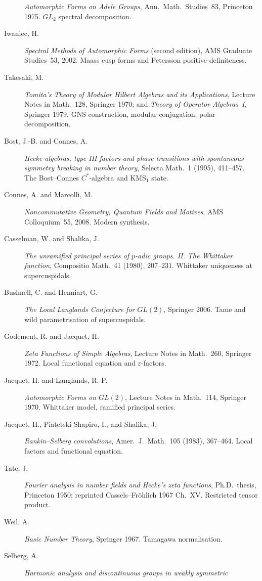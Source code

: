 \begin{description}
\emph{Automorphic Forms on Adele Groups}, Ann.~Math.~Studies~83,
Princeton 1975. \(GL_{2}\) spectral decomposition.
\item[Iwaniec, H.]
\emph{Spectral Methods of Automorphic Forms} (second edition), AMS
Graduate Studies~53, 2002. Maass cusp forms and Petersson
positive-definiteness.
\item[Takesaki, M.]
\emph{Tomita's Theory of Modular Hilbert Algebras and its
Applications}, Lecture Notes in Math.~128, Springer 1970; and
\emph{Theory of Operator Algebras~I}, Springer 1979. GNS
construction, modular conjugation, polar decomposition.
\item[Bost, J.-B. and Connes, A.]
\emph{Hecke algebras, type III factors and phase transitions with
spontaneous symmetry breaking in number theory}, Selecta Math.~1
(1995), 411--457. The Bost--Connes \(C^{*}\)-algebra and KMS\({}_{1}\)
state.
\item[Connes, A. and Marcolli, M.]
\emph{Noncommutative Geometry, Quantum Fields and Motives}, AMS
Colloquium~55, 2008. Modern synthesis.
\item[Casselman, W. and Shalika, J.]
\emph{The unramified principal series of \(p\)-adic groups. II. The
Whittaker function}, Compositio Math.~41 (1980), 207--231. Whittaker
uniqueness at supercuspidals.
\item[Bushnell, C. and Henniart, G.]
\emph{The Local Langlands Conjecture for \(GL(2)\)}, Springer 2006.
Tame and wild parametrisation of supercuspidals.
\item[Godement, R. and Jacquet, H.]
\emph{Zeta Functions of Simple Algebras}, Lecture Notes in Math.~260,
Springer 1972. Local functional equation and \(\varepsilon\)-factors.
\item[Jacquet, H. and Langlands, R. P.]
\emph{Automorphic Forms on \(GL(2)\)}, Lecture Notes in Math.~114,
Springer 1970. Whittaker model, ramified principal series.
\item[Jacquet, H., Piatetski-Shapiro, I., and Shalika, J.]
\emph{Rankin--Selberg convolutions}, Amer.~J.~Math.~105 (1983),
367--464. Local factors and functional equation.
\item[Tate, J.]
\emph{Fourier analysis in number fields and Hecke's zeta functions},
Ph.D.~thesis, Princeton 1950; reprinted Cassels--Fr\"ohlich 1967
Ch.~XV. Restricted tensor product.
\item[Weil, A.]
\emph{Basic Number Theory}, Springer 1967. Tamagawa normalisation.
\item[Selberg, A.]
\emph{Harmonic analysis and discontinuous groups in weakly symmetric
}
\end{description}
